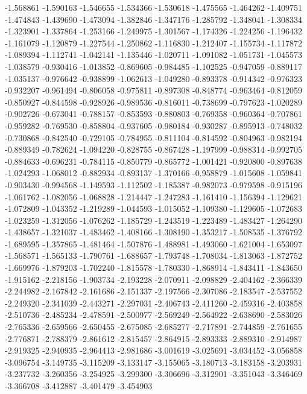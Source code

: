 -1.568861
-1.590163
-1.546655
-1.534366
-1.530618
-1.475565
-1.464262
-1.409751
-1.474843
-1.439690
-1.473094
-1.382846
-1.347176
-1.285792
-1.348041
-1.308334
-1.323901
-1.337864
-1.253166
-1.249975
-1.301567
-1.174326
-1.224256
-1.196432
-1.161079
-1.120879
-1.227544
-1.250862
-1.116830
-1.212407
-1.155734
-1.117872
-1.089394
-1.112741
-1.042141
-1.135446
-1.020711
-1.091082
-1.051731
-1.045573
-1.038579
-0.930416
-1.013852
-0.869605
-0.984485
-1.102525
-0.947059
-0.889117
-1.035137
-0.976642
-0.938899
-1.062613
-1.049280
-0.893378
-0.914342
-0.976323
-0.932207
-0.961494
-0.806058
-0.975811
-0.897308
-0.848774
-0.963464
-0.812059
-0.850927
-0.844598
-0.928926
-0.989536
-0.816011
-0.738699
-0.797623
-1.020289
-0.902726
-0.673041
-0.788157
-0.853593
-0.880803
-0.769358
-0.960364
-0.707861
-0.959282
-0.769530
-0.858804
-0.937605
-0.980184
-0.930287
-0.895913
-0.748032
-0.730868
-0.842540
-0.729105
-0.784955
-0.811104
-0.814592
-0.804963
-0.982194
-0.889349
-0.782624
-1.094220
-0.828755
-0.867428
-1.197999
-0.988314
-0.992705
-0.884633
-0.696231
-0.784115
-0.850779
-0.865772
-1.001421
-0.920800
-0.897638
-1.024293
-1.068012
-0.882934
-0.893137
-1.370166
-0.958879
-1.015608
-1.059841
-0.903430
-0.994568
-1.149593
-1.112502
-1.185387
-0.982073
-0.979598
-0.915196
-1.061762
-1.082056
-1.068828
-1.214447
-1.247283
-1.161410
-1.156394
-1.129621
-1.072809
-1.043352
-1.219289
-1.044593
-1.015052
-1.109380
-1.129605
-1.072683
-1.023259
-1.312056
-1.076262
-1.185729
-1.243519
-1.223489
-1.483427
-1.264290
-1.438657
-1.321037
-1.483462
-1.408166
-1.308190
-1.353217
-1.508535
-1.376792
-1.689595
-1.357865
-1.481464
-1.507876
-1.488981
-1.493060
-1.621004
-1.653097
-1.568571
-1.565133
-1.790761
-1.688657
-1.793748
-1.708034
-1.813063
-1.872752
-1.669976
-1.879203
-1.702240
-1.815578
-1.780330
-1.868914
-1.843411
-1.843650
-1.915162
-2.218156
-1.903734
-2.193228
-2.070911
-2.098829
-2.404162
-2.366339
-2.244982
-2.167842
-2.161686
-2.151337
-2.197566
-2.307086
-2.183547
-2.537552
-2.249320
-2.341039
-2.443271
-2.297031
-2.406743
-2.411260
-2.459316
-2.403858
-2.510736
-2.485234
-2.478591
-2.500977
-2.569249
-2.564922
-2.638690
-2.583026
-2.765336
-2.659566
-2.650455
-2.675085
-2.685277
-2.717891
-2.744859
-2.761655
-2.776871
-2.788379
-2.861612
-2.815457
-2.864915
-2.893333
-2.889310
-2.914987
-2.919325
-2.940935
-2.964413
-2.981686
-3.001619
-3.025691
-3.034452
-3.056858
-3.096754
-3.149735
-3.115209
-3.133147
-3.155065
-3.180713
-3.183158
-3.203931
-3.237732
-3.260356
-3.254925
-3.299300
-3.306696
-3.312901
-3.351043
-3.346469
-3.366708
-3.412887
-3.401479
-3.454903
